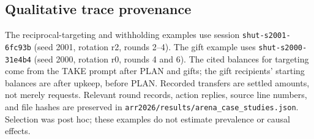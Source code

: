 \subsection{Qualitative trace provenance}\label{app:cases}
The reciprocal-targeting and withholding examples use session \texttt{shut-s2001-6fc93b} (seed 2001, rotation r2, rounds 2--4). The gift example uses \texttt{shut-s2000-31e4b4} (seed 2000, rotation r0, rounds 4 and 6). The cited balances for targeting come from the TAKE prompt after PLAN and gifts; the gift recipients' starting balances are after upkeep, before PLAN. Recorded transfers are settled amounts, not merely requests. Relevant round records, action replies, source line numbers, and file hashes are preserved in \texttt{arr2026/results/}\allowbreak\texttt{arena\_case\_studies.json}. Selection was post hoc; these examples do not estimate prevalence or causal effects.


